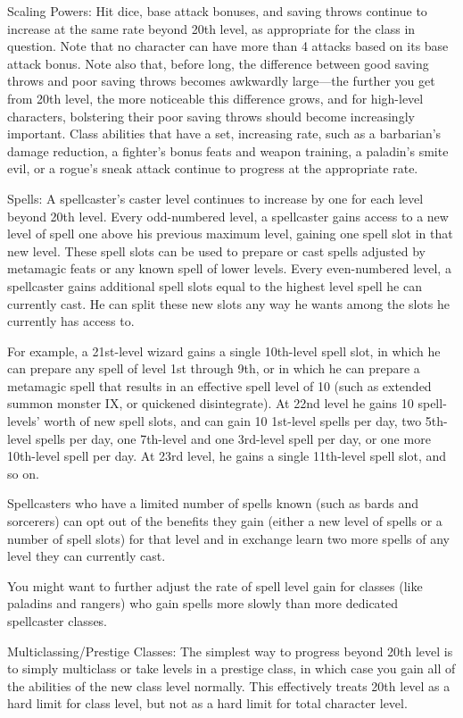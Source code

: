 Scaling Powers: Hit dice, base attack bonuses, and saving throws continue to increase at the same rate beyond 20th level, as appropriate for the class in question. Note that no character can have more than 4 attacks based on its base attack bonus. Note also that, before long, the difference between good saving throws and poor saving throws becomes awkwardly large---the further you get from 20th level, the more noticeable this difference grows, and for high-level characters, bolstering their poor saving throws should become increasingly important. Class abilities that have a set, increasing rate, such as a barbarian's damage reduction, a fighter's bonus feats and weapon training, a paladin's smite evil, or a rogue's sneak attack continue to progress at the appropriate rate.
				
Spells: A spellcaster's caster level continues to increase by one for each level beyond 20th level. Every odd-numbered level, a spellcaster gains access to a new level of spell one above his previous maximum level, gaining one spell slot in that new level. These spell slots can be used to prepare or cast spells adjusted by metamagic feats or any known spell of lower levels. Every even-numbered level, a spellcaster gains additional spell slots equal to the highest level spell he can currently cast. He can split these new slots any way he wants among the slots he currently has access to.
				
For example, a 21st-level wizard gains a single 10th-level spell slot, in which he can prepare any spell of level 1st through 9th, or in which he can prepare a metamagic spell that results in an effective spell level of 10 (such as extended summon monster IX, or quickened disintegrate). At 22nd level he gains 10 spell-levels' worth of new spell slots, and can gain 10 1st-level spells per day, two 5th-level spells per day, one 7th-level and one 3rd-level spell per day, or one more 10th-level spell per day. At 23rd level, he gains a single 11th-level spell slot, and so on.
				
Spellcasters who have a limited number of spells known (such as bards and sorcerers) can opt out of the benefits they gain (either a new level of spells or a number of spell slots) for that level and in exchange learn two more spells of any level they can currently cast.
				
You might want to further adjust the rate of spell level gain for classes (like paladins and rangers) who gain spells more slowly than more dedicated spellcaster classes.
				
Multiclassing/Prestige Classes: The simplest way to progress beyond 20th level is to simply multiclass or take levels in a prestige class, in which case you gain all of the abilities of the new class level normally. This effectively treats 20th level as a hard limit for class level, but not as a hard limit for total character level.
	      	
